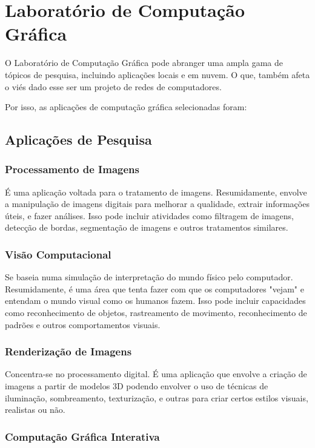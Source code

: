 \section{Laboratório de Computação Gráfica}

O Laboratório de Computação Gráfica pode abranger uma ampla gama de tópicos de pesquisa,
incluindo aplicações locais e em nuvem.
O que, também afeta o viés dado esse ser um projeto de redes de computadores.

Por isso, as aplicações de computação gráfica selecionadas foram:

\subsection{Aplicações de Pesquisa}

\subsubsection{Processamento de Imagens}

É uma aplicação voltada para o tratamento de imagens.
Resumidamente, envolve a manipulação de imagens digitais para melhorar a qualidade, extrair informações úteis, e fazer análises.
Isso pode incluir atividades como filtragem de imagens, detecção de bordas, segmentação de imagens e outros tratamentos similares.

\subsubsection{Visão Computacional}

Se baseia numa simulação de interpretação do mundo físico pelo computador. Resumidamente, é uma área que tenta fazer com que os computadores "vejam" e entendam o mundo visual como os humanos fazem. Isso pode incluir capacidades como reconhecimento de objetos, rastreamento de movimento, reconhecimento de padrões e outros comportamentos visuais.

\subsubsection{Renderização de Imagens}

Concentra\--se no processamento digital. É uma aplicação que envolve a criação de imagens a partir de modelos 3D podendo envolver o uso de técnicas de iluminação, sombreamento, texturização, e outras para criar certos estilos visuais, realistas ou não.

\subsubsection{Computação Gráfica Interativa}

